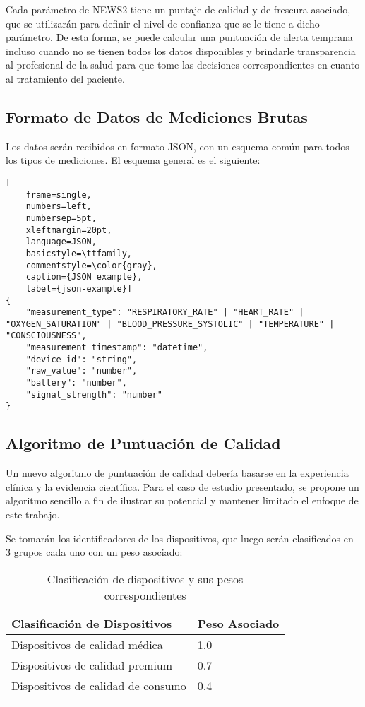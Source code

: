 Cada parámetro de NEWS2 tiene un puntaje de calidad y de frescura asociado, que se utilizarán para definir el nivel de confianza que se le tiene a dicho parámetro.
De esta forma, se puede calcular una puntuación de alerta temprana incluso cuando no se tienen todos los datos disponibles 
y brindarle transparencia al profesional de la salud para que tome las decisiones correspondientes en cuanto al tratamiento del paciente.

\subsection{Formato de Datos de Mediciones Brutas}

Los datos serán recibidos en formato JSON, con un esquema común para todos los tipos de mediciones.
El esquema general es el siguiente:
\begin{lstlisting}[
    frame=single,
    numbers=left,
    numbersep=5pt,
    xleftmargin=20pt,
    language=JSON,
    basicstyle=\ttfamily,
    commentstyle=\color{gray},
    caption={JSON example},
    label={json-example}]
{
    "measurement_type": "RESPIRATORY_RATE" | "HEART_RATE" | "OXYGEN_SATURATION" | "BLOOD_PRESSURE_SYSTOLIC" | "TEMPERATURE" | "CONSCIOUSNESS",
    "measurement_timestamp": "datetime",
    "device_id": "string",
    "raw_value": "number",
    "battery": "number",
    "signal_strength": "number"
}
\end{lstlisting}
\newpage

\subsection{Algoritmo de Puntuación de Calidad}
Un nuevo algoritmo de puntuación de calidad debería basarse en la experiencia clínica y la evidencia científica. Para el caso de estudio presentado, 
se propone un algoritmo sencillo a fin de ilustrar su potencial y mantener limitado el enfoque de este trabajo.\newline

Se tomarán los identificadores de los dispositivos, que luego serán clasificados en 3 grupos cada uno con un peso asociado: 

\begin{longtable}{|p{6cm}|p{3cm}|}
    \hline
    \textbf{Clasificación de Dispositivos} & \textbf{Peso Asociado} \\
    \hline
    \endhead
    Dispositivos de calidad médica & 1.0 \\
    \hline
    Dispositivos de calidad premium & 0.7 \\
    \hline
    Dispositivos de calidad de consumo & 0.4 \\
    \hline
    \caption{Clasificación de dispositivos y sus pesos correspondientes}
    \label{tab:dispositivos}
\end{longtable}

